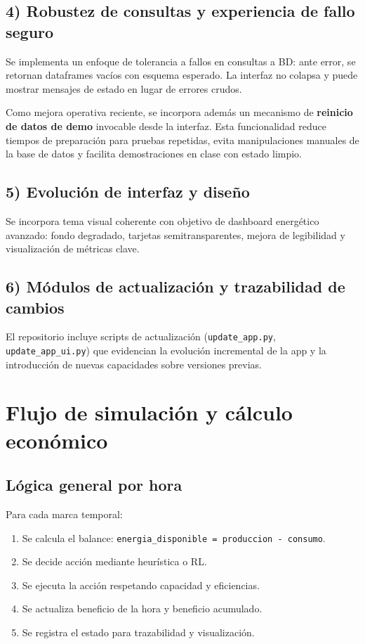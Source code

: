 \documentclass[12pt,a4paper]{article}
\begin{document}
\subsection{4) Robustez de consultas y experiencia de fallo seguro}
Se implementa un enfoque de tolerancia a fallos en consultas a BD: ante error, se retornan dataframes vac\'ios con esquema esperado. La interfaz no colapsa y puede mostrar mensajes de estado en lugar de errores crudos.

Como mejora operativa reciente, se incorpora adem\'as un mecanismo de \textbf{reinicio de datos de demo} invocable desde la interfaz. Esta funcionalidad reduce tiempos de preparaci\'on para pruebas repetidas, evita manipulaciones manuales de la base de datos y facilita demostraciones en clase con estado limpio.

\subsection{5) Evoluci\'on de interfaz y dise\~no}
Se incorpora tema visual coherente con objetivo de dashboard energ\'etico avanzado: fondo degradado, tarjetas semitransparentes, mejora de legibilidad y visualizaci\'on de m\'etricas clave.

\subsection{6) M\'odulos de actualizaci\'on y trazabilidad de cambios}
El repositorio incluye scripts de actualizaci\'on (\texttt{update\_app.py}, \texttt{update\_app\_ui.py}) que evidencian la evoluci\'on incremental de la app y la introducci\'on de nuevas capacidades sobre versiones previas.

\section{Flujo de simulaci\'on y c\'alculo econ\'omico}
\subsection{L\'ogica general por hora}
Para cada marca temporal:
\begin{enumerate}
    \item Se calcula el balance: \texttt{energia\_disponible = produccion - consumo}.
    \item Se decide acci\'on mediante heur\'istica o RL.
    \item Se ejecuta la acci\'on respetando capacidad y eficiencias.
    \item Se actualiza beneficio de la hora y beneficio acumulado.
    \item Se registra el estado para trazabilidad y visualizaci\'on.
\end{enumerate}
\end{document}
